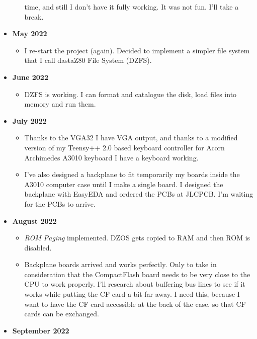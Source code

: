 \documentclass[a4paper,11pt]{article}
\begin{document}
\begin{itemize}
\begin{itemize}
            time, and still I don't have it fully working. It was not fun. I'll
            take a break.
        \end{itemize}
        \item \textbf{May 2022}
        \begin{itemize}
            \item I re-start the project (again). Decided to implement a simpler
            file system that I call dastaZ80 File System (DZFS).
        \end{itemize}
        \item \textbf{June 2022}
        \begin{itemize}
            \item DZFS is working. I can format and catalogue the disk, load
            files into memory and run them.
        \end{itemize}
        \item \textbf{July 2022}
        \begin{itemize}
            \item Thanks to the VGA32 I have VGA output, and thanks to a
            modified version of my Teensy++ 2.0 based keyboard controller for
            Acorn Archimedes A3010 keyboard I have a keyboard working.
            \item I've also designed a backplane to fit temporarily my boards
            inside the A3010 computer case until I make a single board. I
            designed the backplane with EasyEDA and ordered the PCBs at JLCPCB.
            I'm waiting for the PCBs to arrive.
        \end{itemize}
        \item \textbf{August 2022}
        \begin{itemize}
            \item \textit{ROM Paging} implemented. DZOS gets copied to RAM and
            then ROM is disabled.
            \item Backplane boards arrived and works perfectly. Only to take in
            consideration that the CompactFlash board needs to be very close to
            the CPU to work properly. I'll research about buffering bus lines to
            see if it works while putting the CF card a bit far away. I need
            this, because I want to have the CF card accessible at the back of
            the case, so that CF cards can be exchanged.
        \end{itemize}
        \item \textbf{September 2022}

\end{itemize}
\end{document}

